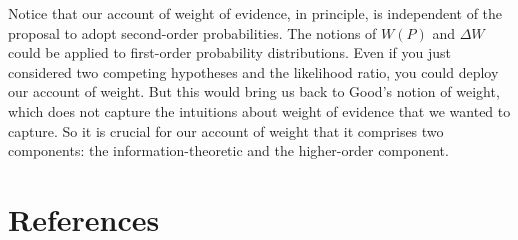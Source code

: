 \documentclass[
  10pt,
  dvipsnames,enabledeprecatedfontcommands]{scrartcl}
\begin{document}
Notice that our account of weight of evidence, in principle, is
independent of the proposal to adopt second-order probabilities. The
notions of \(W(P)\) and \(\Delta W\) could be applied to first-order
probability distributions. Even if you just considered two competing
hypotheses and the likelihood ratio, you could deploy our account of
weight. But this would bring us back to Good's notion of weight, which
does not capture the intuitions about weight of evidence that we wanted
to capture. So it is crucial for our account of weight that it comprises
two components: the information-theoretic and the higher-order
component.


\hypertarget{references}{%
\section*{References}\label{references}}
\end{document}
